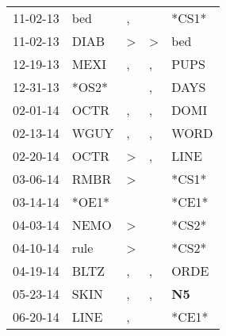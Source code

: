 \begin{supertabular}{p{0.07\textwidth}p{0.06\textwidth}p{0.02\textwidth}p{0.02\textwidth}p{0.06\textwidth}}
          11-02-13\textsuperscript{} &            bed\textsuperscript{} &                , &                  &                            *CS1* \\
          11-02-13\textsuperscript{} &           DIAB\textsuperscript{} &     \textgreater &     \textgreater &            bed\textsuperscript{} \\
          12-19-13\textsuperscript{} &           MEXI\textsuperscript{} &                , &                , &           PUPS\textsuperscript{} \\
          12-31-13\textsuperscript{} &                            *OS2* &                  &                , &           DAYS\textsuperscript{} \\
          02-01-14\textsuperscript{} &           OCTR\textsuperscript{} &                , &                , &           DOMI\textsuperscript{} \\
          02-13-14\textsuperscript{} &           WGUY\textsuperscript{} &                , &                , &           WORD\textsuperscript{} \\
          02-20-14\textsuperscript{} &           OCTR\textsuperscript{} &     \textgreater &                , &           LINE\textsuperscript{} \\
          03-06-14\textsuperscript{} &           RMBR\textsuperscript{} &     \textgreater &                  &                            *CS1* \\
          03-14-14\textsuperscript{} &                            *OE1* &                  &                  &                            *CE1* \\
          04-03-14\textsuperscript{} &           NEMO\textsuperscript{} &     \textgreater &                  &                            *CS2* \\
          04-10-14\textsuperscript{} &           rule\textsuperscript{} &     \textgreater &                  &                            *CS2* \\
          04-19-14\textsuperscript{} &           BLTZ\textsuperscript{} &                , &                , &           ORDE\textsuperscript{} \\
          05-23-14\textsuperscript{} &           SKIN\textsuperscript{} &                , &                , &    \textbf{N5\textsuperscript{}} \\
          06-20-14\textsuperscript{} &           LINE\textsuperscript{} &                , &                  &                            *CE1* \\

\end{supertabular}
